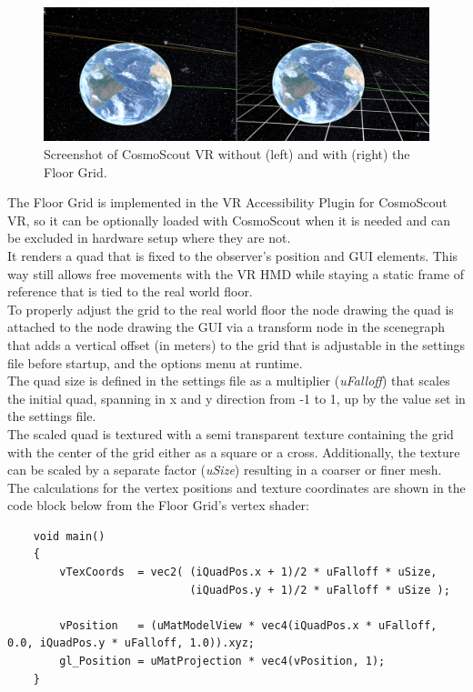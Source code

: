 \begin{figure}[h]
    \centering
    \includegraphics[width=\textwidth]{content/4_1_floorGrid/img/FloorGrid_Screenshot}
    \caption{Screenshot of CosmoScout VR without (left) and with (right) the Floor Grid.}
    \label{fig:floor-grid-screenshot}
\end{figure}

The Floor Grid is implemented in the VR Accessibility Plugin for CosmoScout VR, so it can be optionally loaded with
CosmoScout when it is needed and can be excluded in hardware setup where they are not.
\\
It renders a quad that is fixed to the observer's position and GUI elements.
This way still allows free movements with the VR HMD while staying a static frame of reference that is tied to
the real world floor.
\\
To properly adjust the grid to the real world floor the node drawing the quad is attached to the node drawing the GUI
via a transform node in the scenegraph that adds a vertical offset (in meters) to the grid that is adjustable in the
settings file before startup, and the options menu at runtime.
\\
The quad size is defined in the settings file as a multiplier (\textit{uFalloff}) that scales
the initial quad, spanning in x and y direction from -1 to 1, up by the value set in the settings file.
\\
The scaled quad is textured with a semi transparent texture containing the grid with the center of the grid either as a
square or a cross.
Additionally, the texture can be scaled by a separate factor (\textit{uSize}) resulting in a
coarser or finer mesh.
\\
The calculations for the vertex positions and texture coordinates are shown in the code block below from the Floor
Grid's vertex shader:
\begin{verbatim}
    void main()
    {
        vTexCoords  = vec2( (iQuadPos.x + 1)/2 * uFalloff * uSize,
                            (iQuadPos.y + 1)/2 * uFalloff * uSize );

        vPosition   = (uMatModelView * vec4(iQuadPos.x * uFalloff, 0.0, iQuadPos.y * uFalloff, 1.0)).xyz;
        gl_Position = uMatProjection * vec4(vPosition, 1);
    }
\end{verbatim}
